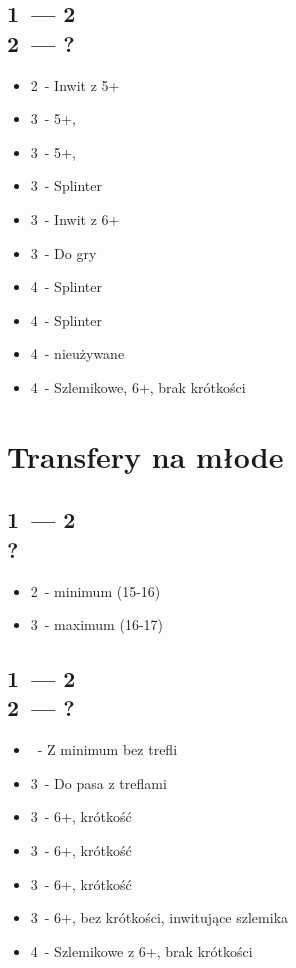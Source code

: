 \documentclass[12pt, a4paper]{article}
\begin{document}
    \subsection{1\ntx\ --- 2\hearts \\ 2\spades\ --- ?}
    \begin{itemize}
        \item 2\nt\ - Inwit z 5+\spades
        \item 3\clubs\ - 5+\clubs, \gf 
        \item 3\diams\ - 5+\diams, \gf \br
        \item 3\hearts\ - Splinter \hearts
        \item 3\spades\ - Inwit z 6+\spades
        \item 3\nt\ - Do gry \br
        \item 4\clubs\ - Splinter \clubs 
        \item 4\diams\ - Splinter \diams
        \item 4\hearts\ - nieużywane
        \item 4\spades\ - Szlemikowe, 6+\spades, brak krótkości
    \end{itemize}


    \pagebreak

    \section{Transfery na młode}
    \subsection{1\ntx\ --- 2\spades \\ ?}
    \begin{itemize}
        \item 2\nt\ - minimum (15-16)
        \item 3\clubs\ - maximum (16-17)
    \end{itemize}

    \subsection{1\ntx\ --- 2\spades \\ 2\ntx\ --- ?}
    \begin{itemize}
        \item \pass\ - Z minimum bez trefli
        \item 3\clubs\ - Do pasa z treflami \br
        \item 3\diams\ - 6+\clubs, krótkość \diams 
        \item 3\hearts\ - 6+\clubs, krótkość \hearts 
        \item 3\spades\ - 6+\clubs, krótkość \spades 
        \item 3\nt\ - 6+\clubs, bez krótkości, inwitujące szlemika
        \item 4\clubs\ - Szlemikowe z 6+\clubs, brak krótkości
    \end{itemize}
\end{document}
